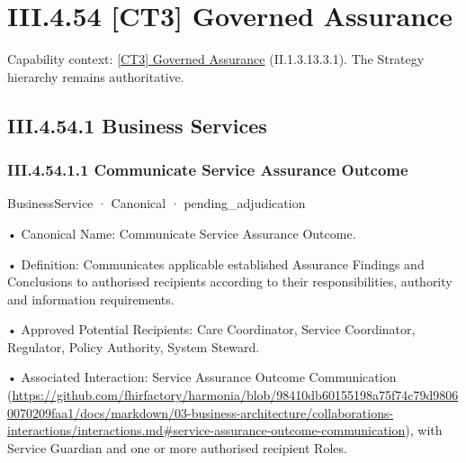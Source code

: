 \section*{III.4.54 [CT3] Governed Assurance}
\label{navigation:III.4.54}

{\small Capability context: \hyperref[element:da1a983d4dcf4d5bb772b8f69bc08426]{[CT3] Governed Assurance} (II.1.3.13.3.1). The Strategy hierarchy remains authoritative.}\par
\subsection*{III.4.54.1 Business Services}
\label{navigation:III.4.54.1}

\subsubsection*{III.4.54.1.1 Communicate Service Assurance Outcome}
\label{navigation:III.4.54.1.1}

\label{element:371b04d6bbf84b53a3c5667ae6df2809}
{\small BusinessService · Canonical · pending\_adjudication}\par

•
Canonical Name: Communicate Service Assurance Outcome.



•
Definition: Communicates applicable established Assurance Findings and Conclusions to authorised recipients according to their responsibilities, authority and information requirements.



•
Approved Potential Recipients: Care Coordinator, Service Coordinator, Regulator, Policy Authority, System Steward.



•
Associated Interaction: Service Assurance Outcome Communication (\url{https://github.com/fhirfactory/harmonia/blob/98410db60155198a75f74c79d98060070209faa1/docs/markdown/03-business-architecture/collaborations-interactions/interactions.md#service-assurance-outcome-communication}), with Service Guardian and one or more authorised recipient Roles.



